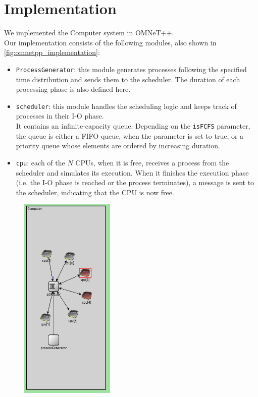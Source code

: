 \chapter{Implementation}
We implemented the Computer system in OMNeT++.\\
Our implementation consists of the following modules, also shown in \autoref{fig:omnetpp_implementation}:
\begin{itemize}
    \item \texttt{ProcessGenerator}: this module generates processes following the specified time distribution and sends them to the scheduler. The duration of each processing phase is also defined here.
    \item \texttt{scheduler}: this module handles the scheduling logic and keeps track of processes in their I-O phase.\\
          It contains an infinite-capacity queue. Depending on the \texttt{isFCFS} parameter, the queue is either a FIFO queue, when the parameter is set to true, or a priority queue whose elements are ordered by increasing duration.
    \item \texttt{cpu}: each of the $N$ CPUs, when it is free, receives a process from the scheduler and simulates its execution. When it finishes the execution phase (i.e. the I-O phase is reached or the process terminates), a message is sent to the scheduler, indicating that the CPU is now free.
\end{itemize}

\begin{figure}[H]
    \captionsetup{type=figure}
    \centering
    \includegraphics[width=0.4\textwidth]{images/example/sim_schema.png}
    \label{fig:omnetpp_implementation}
\end{figure}

